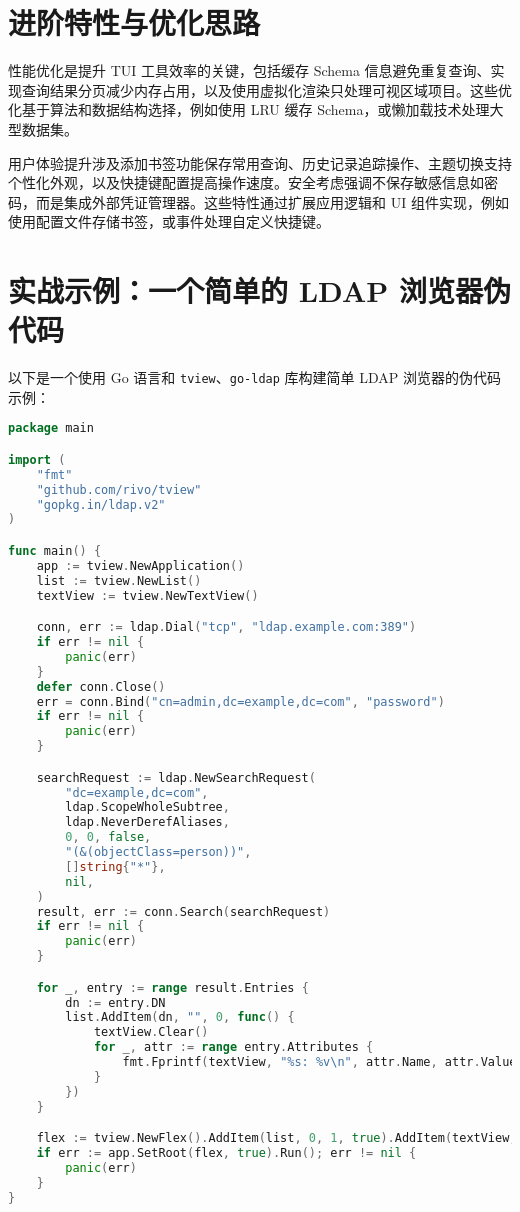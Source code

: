 \chapter{进阶特性与优化思路}
性能优化是提升 TUI 工具效率的关键，包括缓存 Schema 信息避免重复查询、实现查询结果分页减少内存占用，以及使用虚拟化渲染只处理可视区域项目。这些优化基于算法和数据结构选择，例如使用 LRU 缓存 Schema，或懒加载技术处理大型数据集。\par
用户体验提升涉及添加书签功能保存常用查询、历史记录追踪操作、主题切换支持个性化外观，以及快捷键配置提高操作速度。安全考虑强调不保存敏感信息如密码，而是集成外部凭证管理器。这些特性通过扩展应用逻辑和 UI 组件实现，例如使用配置文件存储书签，或事件处理自定义快捷键。\par
\chapter{实战示例：一个简单的 LDAP 浏览器伪代码}
以下是一个使用 Go 语言和 \texttt{tview}、\texttt{go-ldap} 库构建简单 LDAP 浏览器的伪代码示例：\par
\begin{lstlisting}[language=go]
package main

import (
    "fmt"
    "github.com/rivo/tview"
    "gopkg.in/ldap.v2"
)

func main() {
    app := tview.NewApplication()
    list := tview.NewList()
    textView := tview.NewTextView()

    conn, err := ldap.Dial("tcp", "ldap.example.com:389")
    if err != nil {
        panic(err)
    }
    defer conn.Close()
    err = conn.Bind("cn=admin,dc=example,dc=com", "password")
    if err != nil {
        panic(err)
    }

    searchRequest := ldap.NewSearchRequest(
        "dc=example,dc=com",
        ldap.ScopeWholeSubtree,
        ldap.NeverDerefAliases,
        0, 0, false,
        "(&(objectClass=person))",
        []string{"*"},
        nil,
    )
    result, err := conn.Search(searchRequest)
    if err != nil {
        panic(err)
    }

    for _, entry := range result.Entries {
        dn := entry.DN
        list.AddItem(dn, "", 0, func() {
            textView.Clear()
            for _, attr := range entry.Attributes {
                fmt.Fprintf(textView, "%s: %v\n", attr.Name, attr.Values)
            }
        })
    }

    flex := tview.NewFlex().AddItem(list, 0, 1, true).AddItem(textView, 0, 2, false)
    if err := app.SetRoot(flex, true).Run(); err != nil {
        panic(err)
    }
}
\end{lstlisting}
